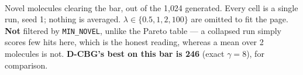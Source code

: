 \documentclass[11pt]{article}
\begin{document}
\begin{table}[htbp]
\centering
\scriptsize
\setlength{\tabcolsep}{3.5pt}
\\[0.4em] \begin{minipage}{0.92\textwidth}\footnotesize Novel molecules clearing the bar, out of the 1{,}024 generated. Every cell is a single run, seed 1; nothing is averaged. $\lambda \in \{0.5, 1, 2, 100\}$ are omitted to fit the page. \textbf{Not} filtered by \texttt{MIN\_NOVEL}, unlike the Pareto table --- a collapsed run simply scores few hits here, which is the honest reading, whereas a mean over 2 molecules is not. \textbf{D-CBG's best on this bar is 246} (exact $\gamma=8$), for comparison.\end{minipage}
\caption{UDLM: hits at ring count $\geq 5$ across the whole $(N, \lambda)$ grid. Columns are (mixture mode) $\times$ $\lambda$.}
\label{tab:hits-grid-ring_count-UDLM}
\end{table}
\end{document}
